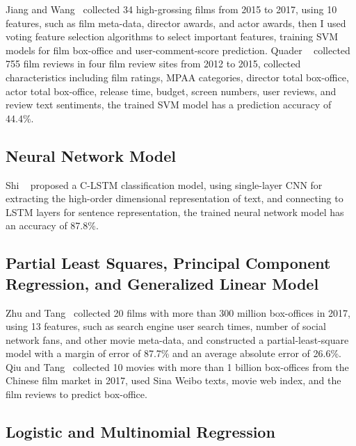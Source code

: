 \documentclass[review]{cvpr}
\begin{document}
  Jiang and Wang~\cite{jiang2018predicting} collected 34 high-grossing films from 2015 to 2017, using 10 features, such as film meta-data, director awards, and actor awards, then I used voting feature selection algorithms to select important features,
  training SVM models for film box-office and user-comment-score prediction.
  Quader \etal~\cite{quader2017machine} collected 755 film reviews in four film review sites from 2012 to 2015, collected characteristics including film ratings, MPAA categories,
  director total box-office, actor total box-office, release time, budget, screen numbers, user reviews, and review text sentiments,
  the trained SVM model has a prediction accuracy of 44.4\%.

\subsection{Neural Network Model}

  Shi \etal~\cite{shi2019c} proposed a C-LSTM classification model, using single-layer CNN for extracting the high-order dimensional representation of text,
  and connecting to LSTM layers for sentence representation, the trained neural network model has an accuracy of 87.8\%.


\subsection{Partial Least Squares, Principal Component Regression, and Generalized Linear Model}

  Zhu and Tang~\cite{zhu2019film} collected 20 films with more than 300 million box-offices in 2017, using 13 features, such as search engine user search times, number of social network fans, and other movie meta-data,
  and constructed a partial-least-square model with a margin of error of 87.7\% and an average absolute error of 26.6\%.
  Qiu and Tang~\cite{qiu2018microblog} collected 10 movies with more than 1 billion box-offices from the Chinese film market in 2017, used Sina Weibo texts, movie web index, and the film reviews to predict box-office.

\subsection{Logistic and Multinomial Regression}
\end{document}
